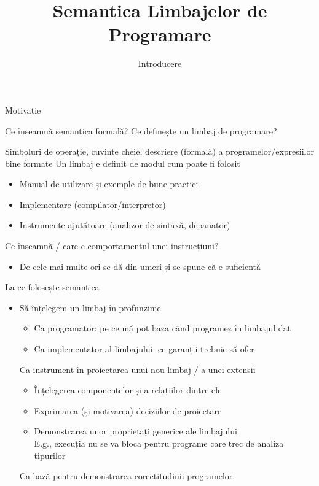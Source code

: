 \documentclass[xcolor=pdftex,romanian,colorlinks]{beamer}
\title[SLP---Introducere]{Semantica Limbajelor de Programare}
\subtitle{Introducere}
\begin{document}
\begin{frame}
  \titlepage
\end{frame}

\begin{section}{Motivație}
  \begin{frame}{Ce înseamnă semantica formală?}%
  {Ce definește un limbaj de programare?}
  \begin{description}
  \vitem[Sintaxa] Simboluri de operație, cuvinte cheie, descriere (formală) a programelor/expresiilor bine formate
  \vitem[Practica] Un limbaj e definit de modul cum poate fi folosit
  \begin{itemize}
  \item Manual de utilizare și exemple de bune practici
  \item Implementare (compilator/interpretor)
  \item Instrumente ajutătoare (analizor de sintaxă, depanator)
  \end{itemize}
  \vitem[Semantica?] Ce înseamnă / care e comportamentul unei instrucțiuni?
  \begin{itemize}
  \item De cele mai multe ori se dă din umeri și se spune că  e suficientă
  \end{itemize}
  \end{description}
  \end{frame}

  \begin{frame}{La ce folosește semantica}
  \begin{itemize}
  \item Să înțelegem un limbaj în profunzime
  \begin{itemize}
  \item Ca programator: pe ce mă pot baza când programez în limbajul dat
  \item Ca implementator al limbajului: ce garanții trebuie să ofer
  \end{itemize}
  \vitem Ca instrument în proiectarea unui nou limbaj / a unei extensii
   \begin{itemize}
  \item Înțelegerea componentelor și a relațiilor dintre ele
  \item Exprimarea (și motivarea)  deciziilor de proiectare
  \item Demonstrarea unor proprietăți generice ale limbajului\\
  E.g., execuția nu se va bloca pentru programe care trec de analiza tipurilor
  \end{itemize}
  \vitem Ca bază pentru demonstrarea corectitudinii programelor.
  \end{itemize}
  \end{frame}
\end{section}
\end{document}
